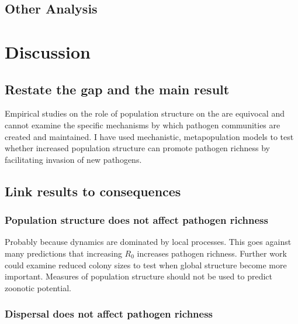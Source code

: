 \subsection{Other Analysis}




\clearpage
\section{Discussion}


\subsection{Restate the gap and the main result}

Empirical studies on the role of population structure on the are equivocal and cannot examine the specific mechanisms by which pathogen communities are created and maintained.
I have used mechanistic, metapopulation models to test whether increased population structure can promote pathogen richness by facilitating invasion of new pathogens.



\subsection{Link results to consequences}

\subsubsection{Population structure does not affect pathogen richness}

Probably because dynamics are dominated by local processes.
This goes against many predictions that increasing $R_0$ increases pathogen richness.
Further work could examine reduced colony sizes to test when global structure become more important.
Measures of population structure should not be used to predict zoonotic potential.

\subsubsection{Dispersal does not affect pathogen richness}


